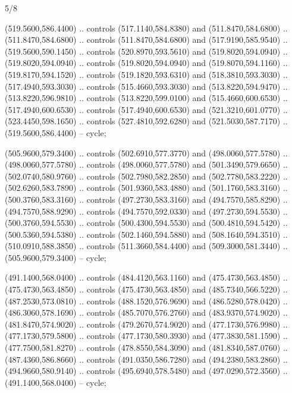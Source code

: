 \begin{flagdescription}{5/8}
\begin{scope}[shift={(m)}]
\begin{scope}[scale=\flagwidth/220,y=0.1mm, x=0.1mm, yscale=-1,shift={(-596,-360)}]
\begin{scope}[draw=black,line join=round,line cap=round,line width=0.381\lw]
\begin{scope}[line width=0.534\lw,fill=green]
 (519.5600,586.4400) .. controls (517.1140,584.8380) and
  (511.8470,584.6800) .. (511.8470,584.6800) .. controls (511.8470,584.6800) and
  (517.9190,585.9540) .. (519.5600,590.1450) .. controls (520.8970,593.5610) and
  (519.8020,594.0940) .. (519.8020,594.0940) .. controls (519.8020,594.0940) and
  (519.8070,594.1160) .. (519.8170,594.1520) .. controls (519.1820,593.6310) and
  (518.3810,593.3030) .. (517.4940,593.3030) .. controls (515.4660,593.3030) and
  (513.8220,594.9470) .. (513.8220,596.9810) .. controls (513.8220,599.0100) and
  (515.4660,600.6530) .. (517.4940,600.6530) .. controls (517.4940,600.6530) and
  (521.3210,601.0770) .. (523.4450,598.1650) .. controls (527.4810,592.6280) and
  (521.5030,587.7170) .. (519.5600,586.4400) -- cycle;

 (505.9600,579.3400) .. controls (502.6910,577.3770) and
  (498.0060,577.5780) .. (498.0060,577.5780) .. controls (498.0060,577.5780) and
  (501.3490,579.6650) .. (502.0740,580.9760) .. controls (502.7980,582.2850) and
  (502.7780,583.2220) .. (502.6260,583.7890) .. controls (501.9360,583.4880) and
  (501.1760,583.3160) .. (500.3760,583.3160) .. controls (497.2730,583.3160) and
  (494.7570,585.8290) .. (494.7570,588.9290) .. controls (494.7570,592.0330) and
  (497.2730,594.5530) .. (500.3760,594.5530) .. controls (500.4300,594.5530) and
  (500.4810,594.5420) .. (500.5360,594.5380) .. controls (502.1460,594.5880) and
  (508.1640,594.3510) .. (510.0910,588.3850) .. controls (511.3660,584.4400) and
  (509.3000,581.3440) .. (505.9600,579.3400) -- cycle;

 (491.1400,568.0400) .. controls (484.4120,563.1160) and
  (475.4730,563.4850) .. (475.4730,563.4850) .. controls (475.4730,563.4850) and
  (485.7340,566.5220) .. (487.2530,573.0810) .. controls (488.1520,576.9690) and
  (486.5280,578.0420) .. (486.3060,578.1690) .. controls (485.7070,576.2760) and
  (483.9370,574.9020) .. (481.8470,574.9020) .. controls (479.2670,574.9020) and
  (477.1730,576.9980) .. (477.1730,579.5800) .. controls (477.1730,580.3930) and
  (477.3830,581.1590) .. (477.7500,581.8270) .. controls (478.8550,584.3090) and
  (481.8340,587.0760) .. (487.4360,586.8660) .. controls (491.0350,586.7280) and
  (494.2380,583.2860) .. (494.9660,580.9140) .. controls (495.6940,578.5480) and
  (497.0290,572.3560) .. (491.1400,568.0400) -- cycle;


\end{scope}
\end{scope}
\end{scope}
\end{scope}
\end{flagdescription}
